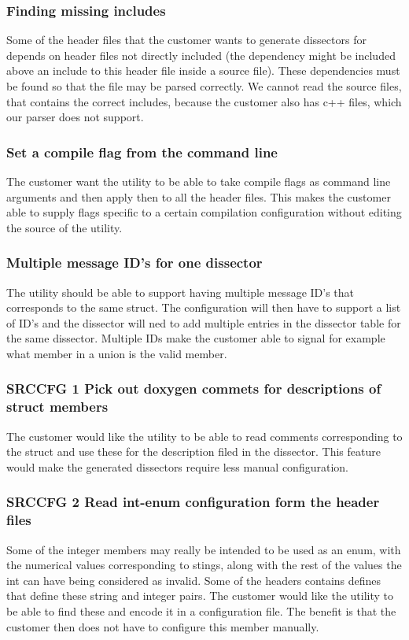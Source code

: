 \subsubsection{Finding missing includes}
Some of the header files that the customer wants to generate dissectors for depends on header files not directly included (the dependency might be included above an include to this header file inside a source file). These dependencies must be found so that the file may be parsed correctly. We cannot read the source files, that contains the correct includes, because the customer also has c++ files, which our parser does not support.
\subsubsection{Set a compile flag from the command line}
The customer want the utility to be able to take compile flags as command line arguments and then apply then to all the header files. This makes the customer able to supply flags specific to a certain compilation configuration without editing the source of the utility.
\subsubsection{Multiple message ID’s for one dissector}
The utility should be able to support having multiple message ID’s that corresponds to the same struct. The configuration will then have to support a list of ID’s and the dissector will ned to add multiple entries in the dissector table for the same dissector. Multiple IDs make the customer able to signal for example what member in a union is the valid member.
\subsubsection{SRCCFG 1 Pick out doxygen commets for descriptions of struct members}
The customer would like the utility to be able to read comments corresponding to the struct and use these for the description filed in the dissector. This feature would make the generated dissectors require less manual configuration.
\subsubsection{SRCCFG 2 Read int-enum configuration form the header files}
Some of the integer members may really be intended to be used as an enum, with the numerical values corresponding to stings, along with the rest of the values the int can have being considered as invalid. Some of the headers contains defines that define these string and integer pairs. The customer would like the utility to be able to find these and encode it in a configuration file. The benefit is that the customer then does not have to configure this member manually.
